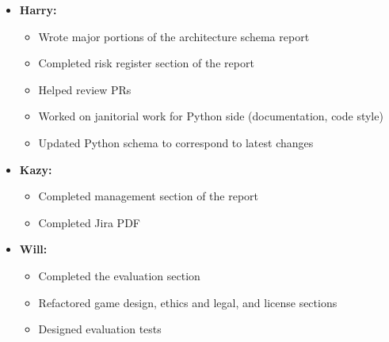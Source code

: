 \documentclass[11pt]{article}
\begin{document}
\begin{itemize}
        \item \textbf{Harry:}
        \begin{itemize}
            \item Wrote major portions of the architecture schema report
            \item Completed risk register section of the report
            \item Helped review PRs
            \item Worked on janitorial work for Python side (documentation, code style)
            \item Updated Python schema to correspond to latest changes
        \end{itemize}

        \item \textbf{Kazy:}
        \begin{itemize}
            \item Completed management section of the report
            \item Completed Jira PDF
        \end{itemize}

        \item \textbf{Will:}
        \begin{itemize}
            \item Completed the evaluation section
            \item Refactored game design, ethics and legal, and license sections
            \item Designed evaluation tests
        \end{itemize}
    \end{itemize}
\end{document}
